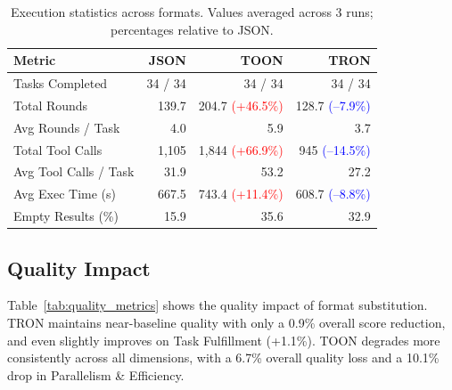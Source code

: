\documentclass[10pt,twocolumn,letterpaper]{article}
\begin{document}
\begin{table}[ht]
    \centering
    \caption{Execution statistics across formats. Values averaged across 3 runs; percentages relative to JSON.}
    \label{tab:exec_stats}
    \footnotesize
    \begin{tabular}{@{}lrrr@{}}
        \toprule
        \textbf{Metric} & \textbf{JSON} & \textbf{TOON} & \textbf{TRON} \\
        \midrule
        Tasks Completed           & 34 / 34      & 34 / 34      & 34 / 34 \\
        Total Rounds              & 139.7        & 204.7 {\scriptsize\textcolor{red}{(+46.5\%)}} & 128.7 {\scriptsize\textcolor{blue}{(--7.9\%)}} \\
        Avg Rounds / Task         & 4.0          & 5.9          & 3.7 \\
        Total Tool Calls          & 1,105        & 1,844 {\scriptsize\textcolor{red}{(+66.9\%)}} & 945 {\scriptsize\textcolor{blue}{(--14.5\%)}} \\
        Avg Tool Calls / Task     & 31.9         & 53.2         & 27.2 \\
        Avg Exec Time (s)         & 667.5        & 743.4 {\scriptsize\textcolor{red}{(+11.4\%)}} & 608.7 {\scriptsize\textcolor{blue}{(--8.8\%)}} \\
        Empty Results (\%)        & 15.9         & 35.6         & 32.9 \\
        \bottomrule
    \end{tabular}
\end{table}

\subsection{Quality Impact}

Table~\ref{tab:quality_metrics} shows the quality impact of format substitution. TRON maintains near-baseline quality with only a 0.9\% overall score reduction, and even slightly improves on Task Fulfillment (+1.1\%). TOON degrades more consistently across all dimensions, with a 6.7\% overall quality loss and a 10.1\% drop in Parallelism \& Efficiency.
\end{document}
